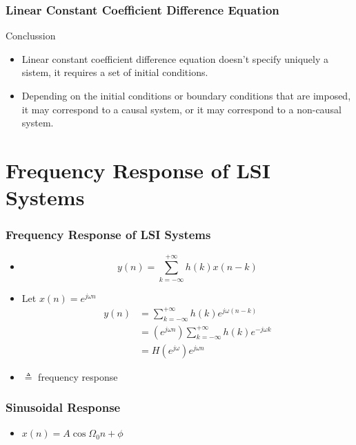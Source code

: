 \documentclass[pdflatex,compress]{beamer}
\begin{document}
\begin{frame}
	\frametitle{Linear Constant Coefficient Difference Equation}
	\begin{alertblock}{Conclussion}
		\begin{itemize}
			\item Linear constant coefficient difference equation doesn't specify uniquely a sistem, it requires a set of initial conditions.
			\item Depending on the initial conditions or boundary conditions that are imposed, it may correspond to a causal system, or it may correspond to a non-causal system.
		\end{itemize}
	\end{alertblock}
\end{frame}

\section{Frequency Response of LSI Systems}

\begin{frame}
	\frametitle{Frequency Response of LSI Systems}
	\begin{itemize}
		\item[] \[ y(n) = \sum_{k = -\infty}^{+\infty} h(k) x(n-k)\]
		\item[] Let $ x(n) = e^{j\omega n} $
		\begin{align*}
			y(n) &= \sum_{k = -\infty}^{+\infty} h(k) e^{j\omega (n - k)} \\
			&= (e^{j\omega n} ) \sum_{k = -\infty}^{+\infty} h(k) e^{-j\omega k} \\ 
			&= H(e^{j\omega}) e^{j\omega n}
		\end{align*}
		\item[] $ \triangleq $ frequency response
	\end{itemize}
\end{frame}

\begin{frame}
	\frametitle{Sinusoidal Response}
	\begin{itemize}
		\item[] $ x(n) = A\cos \Omega_0 n + \phi $
	\end{itemize}
\end{frame}
\end{document}
